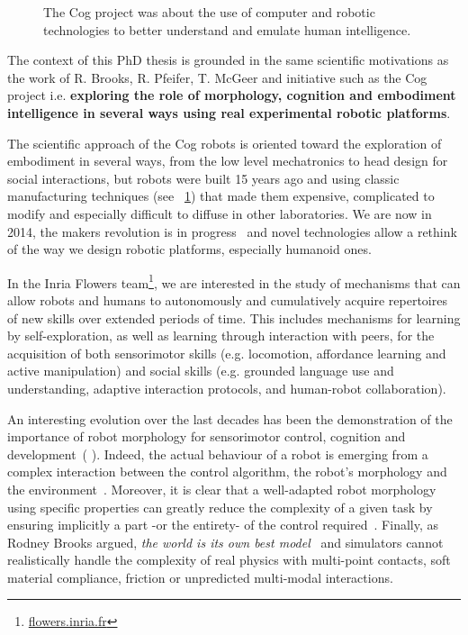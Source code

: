 \begin{figure}[tb]
\centering
    \hfil
    \caption{The Cog project was about the use of computer and robotic technologies to better understand and emulate human intelligence.}
    \label{fig:cog_project}
\end{figure}


The context of this PhD thesis is grounded in the same scientific motivations as the work of R. Brooks, R. Pfeifer, T. McGeer and initiative such as the Cog project i.e. \textbf{exploring the role of morphology, cognition and embodiment intelligence in several ways using real experimental robotic platforms}.

The scientific approach of the Cog robots is oriented toward the exploration of embodiment in several ways, from the low level mechatronics to head design for social interactions, but robots were built 15 years ago and using classic manufacturing techniques (see \figurename~\ref{fig:cog_project}) that made them expensive, complicated to modify and especially difficult to diffuse in other laboratories.
We are now in 2014, the makers revolution is in progress~\parencite{anderson2012makers} and novel technologies allow a rethink of the way we design robotic platforms, especially humanoid ones.


In the Inria Flowers team\footnote{\url{flowers.inria.fr}}, we are interested in the study of mechanisms that can allow robots and humans to autonomously and cumulatively acquire repertoires of new skills over extended periods of time. This includes mechanisms for learning by self-exploration, as well as learning through interaction with peers, for the acquisition of both sensorimotor skills (e.g. locomotion, affordance learning and active manipulation) and social skills (e.g. grounded language use and understanding, adaptive interaction protocols, and human-robot collaboration).

An interesting evolution over the last decades has been the demonstration of the importance of robot morphology for sensorimotor control, cognition and development~(\cite{kaplan2008corps} \cite{steels1995artificial} \cite{Pfeifer06}). Indeed, the actual behaviour of a robot is emerging from a complex interaction between the control algorithm, the robot’s morphology and the environment~\parencite{Steels1991emergence}. Moreover, it is clear that a well-adapted robot morphology using specific properties can greatly reduce the complexity of a given task by ensuring implicitly a part -or the entirety- of the control required~\parencite{pfeifer2005morphological}.
Finally, as Rodney Brooks argued, \emph{the world is its own best model}~\parencite{brooks1991intelligence} and simulators cannot realistically handle the complexity of real physics with multi-point contacts, soft material compliance, friction or unpredicted multi-modal interactions.



